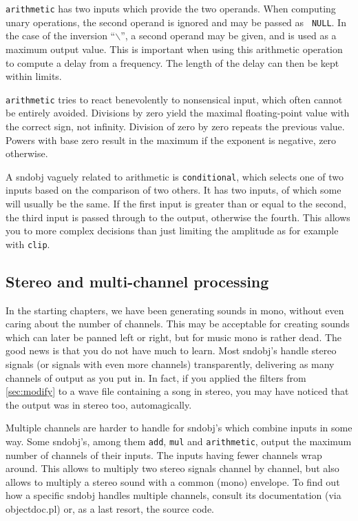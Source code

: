 \documentclass{article}
\begin{document}
{\tt arithmetic} has two inputs which provide the two operands.  When computing
unary operations, the second operand is ignored and may be passed as {\tt
NULL}.  In the case of the inversion ``$\backslash$'', a second operand may be
given, and is used as a maximum output value.  This is important when using
this arithmetic operation to compute a delay from a frequency.  The length of
the delay can then be kept within limits.

{\tt arithmetic} tries to react benevolently to nonsensical input, which often
cannot be entirely avoided.  Divisions by zero yield the maximal floating-point
value with the correct sign, not infinity.  Division of zero  by zero repeats
the previous value.  Powers with  base zero result in the maximum if the
exponent is negative, zero otherwise.

A sndobj vaguely related to arithmetic is {\tt conditional}, which selects one
of two inputs based on the comparison of two others.  It has two inputs, of
which some will usually be the same.  If the first input is greater than or
equal to the second, the third input is passed through to the output, otherwise
the fourth.  This allows you to more complex decisions than just limiting the
amplitude as for example with {\tt clip}.


\subsection{Stereo and multi-channel processing}
\label{sec:stereo}

In the starting chapters, we have been generating sounds in mono, without even
caring about the number of channels.  This may  be acceptable for creating
sounds which can later be panned left or right, but for music mono is rather
dead.  The good news is that you do not have much to learn.  Most sndobj's
handle stereo signals (or signals with even more channels) transparently,
delivering as many channels of output as you put in.  In fact, if you applied
the filters from \autoref{sec:modify} to a wave file containing a song in
stereo, you may have noticed that the output was in stereo too, automagically.

Multiple channels are harder to handle for sndobj's which combine inputs in
some way.  Some sndobj's, among them {\tt add}, {\tt mul} and {\tt arithmetic},
output the maximum number of channels of their inputs.  The inputs having fewer
channels wrap around.  This allows to multiply two stereo signals channel by
channel, but also allows to multiply a stereo sound with a common (mono)
envelope.  To find out how a specific sndobj handles multiple channels, consult
its documentation (via objectdoc.pl) or, as a last resort, the source code.
\end{document}
